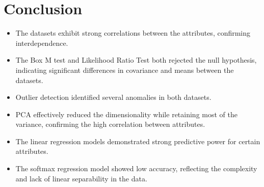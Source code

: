 \documentclass[11pt]{article}
\begin{document}
\section{Conclusion}
\begin{itemize}
    \item The datasets exhibit strong correlations between the attributes, confirming interdependence.
    \item The Box M test and Likelihood Ratio Test both rejected the null hypothesis, indicating significant differences in covariance and means between the datasets.
    \item Outlier detection identified several anomalies in both datasets.
    \item PCA effectively reduced the dimensionality while retaining most of the variance, confirming the high correlation between attributes.
    \item The linear regression models demonstrated strong predictive power for certain attributes.
    \item The softmax regression model showed low accuracy, reflecting the complexity and lack of linear separability in the data.
\end{itemize}
\end{document}
